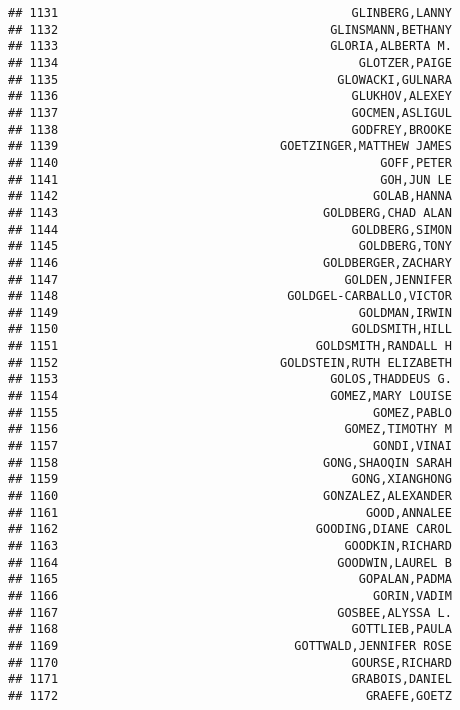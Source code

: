 \documentclass[
]{article}
\begin{document}
\begin{verbatim}
## 1131                                         GLINBERG,LANNY
## 1132                                      GLINSMANN,BETHANY
## 1133                                      GLORIA,ALBERTA M.
## 1134                                          GLOTZER,PAIGE
## 1135                                       GLOWACKI,GULNARA
## 1136                                         GLUKHOV,ALEXEY
## 1137                                         GOCMEN,ASLIGUL
## 1138                                         GODFREY,BROOKE
## 1139                               GOETZINGER,MATTHEW JAMES
## 1140                                             GOFF,PETER
## 1141                                             GOH,JUN LE
## 1142                                            GOLAB,HANNA
## 1143                                     GOLDBERG,CHAD ALAN
## 1144                                         GOLDBERG,SIMON
## 1145                                          GOLDBERG,TONY
## 1146                                     GOLDBERGER,ZACHARY
## 1147                                        GOLDEN,JENNIFER
## 1148                                GOLDGEL-CARBALLO,VICTOR
## 1149                                          GOLDMAN,IRWIN
## 1150                                         GOLDSMITH,HILL
## 1151                                    GOLDSMITH,RANDALL H
## 1152                               GOLDSTEIN,RUTH ELIZABETH
## 1153                                      GOLOS,THADDEUS G.
## 1154                                      GOMEZ,MARY LOUISE
## 1155                                            GOMEZ,PABLO
## 1156                                        GOMEZ,TIMOTHY M
## 1157                                            GONDI,VINAI
## 1158                                     GONG,SHAOQIN SARAH
## 1159                                         GONG,XIANGHONG
## 1160                                     GONZALEZ,ALEXANDER
## 1161                                           GOOD,ANNALEE
## 1162                                    GOODING,DIANE CAROL
## 1163                                        GOODKIN,RICHARD
## 1164                                       GOODWIN,LAUREL B
## 1165                                          GOPALAN,PADMA
## 1166                                            GORIN,VADIM
## 1167                                       GOSBEE,ALYSSA L.
## 1168                                         GOTTLIEB,PAULA
## 1169                                 GOTTWALD,JENNIFER ROSE
## 1170                                         GOURSE,RICHARD
## 1171                                         GRABOIS,DANIEL
## 1172                                           GRAEFE,GOETZ

\end{verbatim}
\end{document}

